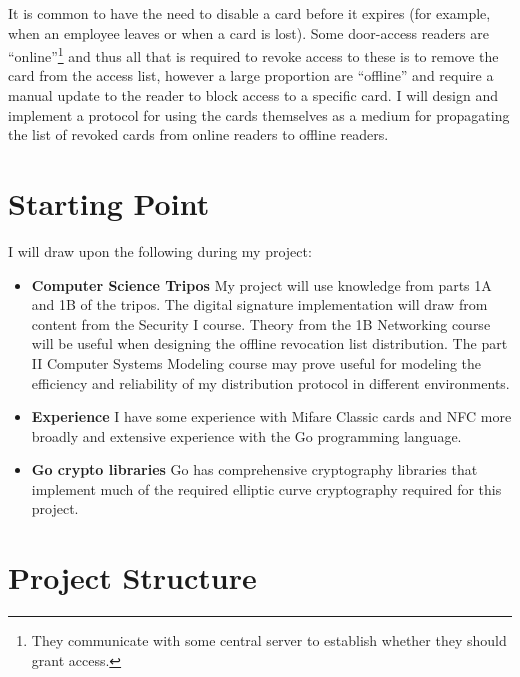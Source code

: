 \documentclass[a4paper, 12pt]{article}
\begin{document}
  It is common to have the need to disable a card before it expires (for
  example, when an employee leaves or when a card is lost). Some door-access
  readers are ``online''\footnote{They communicate with some central server to
  establish whether they should grant access.} and thus all that is required to
  revoke access to these is to remove the card from the access list, however a
  large proportion are ``offline''\footnotemark{} and require a manual update to
  the reader to block access to a specific card. I will design and implement a
  protocol for using the cards themselves as a medium for propagating the list
  of revoked cards from online readers to offline readers.




  \section*{Starting Point}

  I will draw upon the following during my project:

  \begin{itemize}
    \item \textbf{Computer Science Tripos} \newline
      My project will use knowledge from parts 1A and 1B of the tripos. The
      digital signature implementation will draw from content from the Security
      I course. Theory from the 1B Networking course will be useful when
      designing the offline revocation list distribution. The part II Computer
      Systems Modeling course may prove useful for modeling the efficiency and
      reliability of my distribution protocol in different environments.

    \item \textbf{Experience} \newline
      I have some experience with Mifare Classic cards and NFC more broadly and
      extensive experience with the Go programming language.

    \item \textbf{Go crypto libraries} \newline
      Go has comprehensive cryptography libraries that implement much of the
      required elliptic curve cryptography required for this project.
  \end{itemize}

  \section*{Project Structure}
\end{document}
